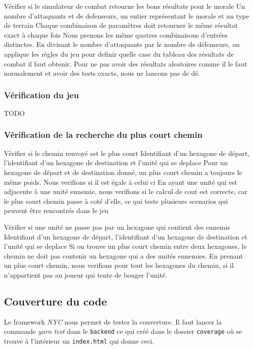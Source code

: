 \mytest
{Vérifier si le simulateur de combat retourne les bons résultats pour le morale}
{Un nombre d'attaquants et de defenseurs, un entier représentant le morale et un type de terrain}
{Chaque combinaison de paramètres doit retourner le même résultat exact à chaque fois}
{Nous prenons les même quatres combinaisons d'entrées distinctes.
    En divisant le nombre d'attaquants par le nombre de défenseurs, on applique les règles du jeu pour definir
    quelle case du tableau des résultats de combat il faut obtenir. Pour ne pas avoir des résultats aleatoires comme
    il le faut normalement et avoir des tests exacts, nous ne lancons pas de dé.}


\subsubsection{Vérification du jeu}

TODO

\subsubsection{Vérification de la recherche du plus court chemin}

\mytest
{Vérifier si le chemin renvoyé est le plus court}
{Identifiant d'un hexagone de départ, l'identifiant d'un hexagone de destination et l'unité qui se deplace}
{Pour un hexagone de départ et de destination donné, un plus court chemin a toujours le même poids. Nous verifions
    si il est égale à celui ci}
{En ayant une unité qui est adjacente à une unité ennemie, nous verifions si le calcul de cout est correcte, car
    le plus court chemin passe à coté d'elle, ce qui teste plusieurs scenarios qui peuvent être rencontrés dans le jeu}

\mytest
{Vérifier si une unité ne passe pas par un hexagone qui contient des ennemis}
{Identifiant d'un hexagone de départ, l'identifiant d'un hexagone de destination et l'unité qui se deplace}
{Si on trouve un plus court chemin entre deux hexagones, le chemin ne doit pas contenir un hexagone qui a des
    unités ennemies.}
{En prenant un plus court chemin, nous verifions pour tout les hexagones du chemin, si il n'appartient pas
    au joueur qui tente de bouger l'unité.}

\subsection{Couverture du code}

Le framework \emph{NYC} nous permet de tester la couverture. Il faut lancer la commande \emph{yarn test} dans le \lstinline{backend} ce qui créé dans le dossier \lstinline{coverage} où se trouve à l'intérieur un \lstinline{index.html} qui donne ceci.

